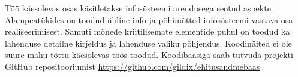 Töö käesolevas osas käsitletakse infosüsteemi arendusega seotud aspekte. Alampeatükides on toodud üldine info ja põhimõtted infosüsteemi vastava osa
realiseerimisest. Samuti mõnede kriitilisemate elementide puhul on toodud ka lahenduse detailne kirjeldus ja lahenduse valiku põhjendus.
Koodinäited ei ole suure mahu tõttu käesolevas töös toodud. Koodibaasiga saab tutvuda projekti GitHub repositooriumist \url{https://github.com/gildix/ehitusandmebaas}





